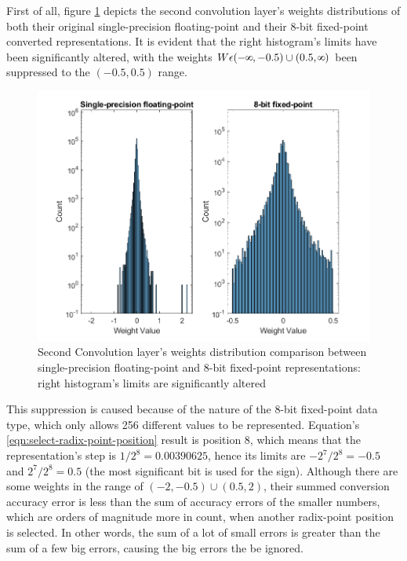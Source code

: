 First of all, figure \ref{fig:weight-distribution-comparison-conv2} depicts the second convolution layer's weights distributions of both their original single-precision floating-point and their 8-bit fixed-point converted representations. It is evident that the right histogram's limits have been significantly altered, with the weights $W \epsilon (-\infinity, -0.5) \cup (0.5, \infinity)$ been suppressed to the $(-0.5, 0.5)$ range.

\begin{figure} [H]
	\centering
	\includegraphics[scale=0.9]{Images/Weights-distributions/original-vs-fixed8/weight-distribution-conv2.png}
	\decoRule
	\caption[Second Convolution layer's weights distribution comparison between single-precision floating-point and 8-bit fixed-point representations]{Second Convolution layer's weights distribution comparison between single-precision floating-point and 8-bit fixed-point representations: right histogram's limits are significantly altered}
	\label{fig:weight-distribution-comparison-conv2}
\end{figure}

This suppression is caused because of the nature of the 8-bit fixed-point data type, which only allows 256 different values to be represented. Equation's \ref{eqn:select-radix-point-position} result is position 8, which means that the representation's step is $1/2^8 = 0.00390625$, hence its limits are $-2^7/2^8 = -0.5$ and $2^7/2^8 = 0.5$ (the most significant bit is used for the sign). Although there are some weights in the range of $(-2, -0.5) \cup (0.5, 2)$, their summed conversion accuracy error is less than the sum of accuracy errors of the smaller numbers, which are orders of magnitude more in count, when another radix-point position is selected. In other words, the sum of a lot of small errors is greater than the sum of a few big errors, causing the big errors the be ignored.

